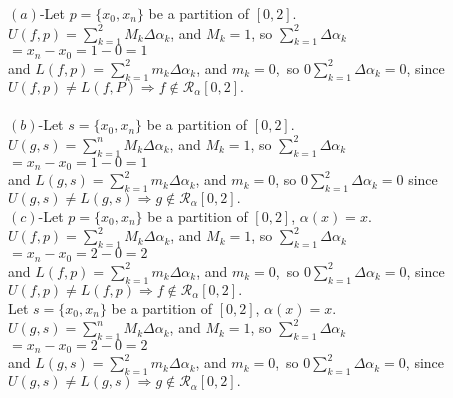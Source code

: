 \documentclass{book}
\begin{document}
\begin{tcolorbox}[enhanced,attach boxed title to top center={yshift=-3mm,yshifttext=-1mm},
colback=blue!5!white,colframe=blue!75!black,colbacktitle=red!80!black,
title=Exercise 51.12:,fonttitle=\bfseries,
boxed title style={size=small,colframe=red!50!black}]

$(a)$-Let $p=\{x_0,x_n\}$ be a partition of $[0,2]$.\\
$U(f,p)=\sum_{k=1}^2 M_k\Delta\alpha_k$, and $M_k=1$, so $\sum_{k=1}^2\Delta\alpha_k$\\
$=x_n-x_0=1-0=1$\\
and 
$L(f,p)=\sum_{k=1}^2 m_k\Delta\alpha_k$, and $m_k=0$,\ so
$0\sum_{k=1}^2\Delta\alpha_k=0$, since $U(f,p)\neq L(f,P)\Rightarrow f\notin\mathscr{R}_\alpha[0,2].$
\\
\noindent{\color{blue}\rule{\linewidth}{.3mm}}\\
$(b)$-Let $s=\{x_0,x_n\}$ be a partition of $[0,2]$.\\
$U(g,s)=\sum_{k=1}^n M_k\Delta\alpha_k$, and $M_k=1$, so $\sum_{k=1}^2\Delta\alpha_k$\\
$=x_n-x_0=1-0=1$\\
and $L(g,s)=\sum_{k=1}^2 m_k\Delta\alpha_k$, and $m_k=0$, so
$0\sum_{k=1}^2\Delta\alpha_k=0$
since $U(g,s)\neq L(g,s)\Rightarrow g\notin\mathscr{R}_\alpha[0,2].$\\
\noindent{\color{blue}\rule{\linewidth}{.3mm}}
$(c)$-Let $p=\{x_0,x_n\}$ be a partition of $[0,2]$, $\alpha(x)=x$.\\
$U(f,p)=\sum_{k=1}^2 M_k\Delta\alpha_k$, and $M_k=1$, so $\sum_{k=1}^2\Delta\alpha_k$\\
$=x_n-x_0=2-0=2$\\
and $L(f,p)=\sum_{k=1}^2 m_k\Delta\alpha_k$, and $m_k=0$,\ so
$0\sum_{k=1}^2\Delta\alpha_k=0$, since $U(f,p)\neq L(f,p)\Rightarrow f\notin\mathscr{R}_\alpha[0,2].$\\
\noindent{\color{blue}\rule{\linewidth}{.3mm}}
Let $s=\{x_0,x_n\}$ be a partition of $[0,2]$, $\alpha(x)=x$.\\
$U(g,s)=\sum_{k=1}^n M_k\Delta\alpha_k$, and $M_k=1$, so $\sum_{k=1}^2\Delta\alpha_k$\\
$=x_n-x_0=2-0=2$\\
and $L(g,s)=\sum_{k=1}^2 m_k\Delta\alpha_k$, and $m_k=0$,\ so
$0\sum_{k=1}^2\Delta\alpha_k=0$, since $U(g,s)\neq L(g,s)\Rightarrow g\notin\mathscr{R}_\alpha[0,2].$\\

\end{tcolorbox}
\end{document}

